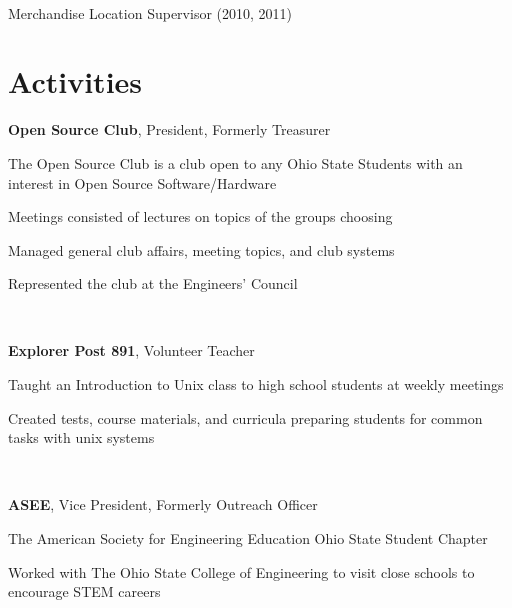 \documentclass[letterpaper]{resume}
\begin{document}
~

Merchandise Location Supervisor (2010, 2011)

%

\section{Activities}

\textbf{Open Source Club}, President, Formerly Treasurer
\begin{compactitem}
\item The Open Source Club is a club open to any Ohio State Students with an interest in Open Source Software/Hardware
\item Meetings consisted of lectures on topics of the groups choosing
\item Managed general club affairs, meeting topics, and club systems
\item Represented the club at the Engineers' Council
\end{compactitem}

~

\textbf{Explorer Post 891}, Volunteer Teacher
\begin{compactitem}
\item Taught an Introduction to Unix class to high school students at
	weekly meetings
\item Created tests, course materials, and curricula preparing students
	for common tasks with unix systems
\end{compactitem}

~

\textbf{ASEE}, Vice President, Formerly Outreach Officer
\begin{compactitem}
\item The American Society for Engineering Education Ohio State Student Chapter
\item Worked with The Ohio State College of Engineering to visit close schools to encourage STEM careers
\end{compactitem}
\end{document}
